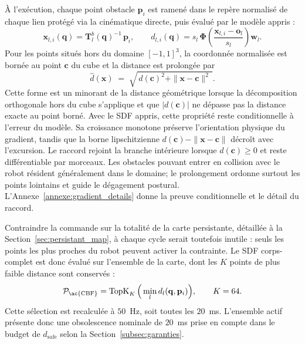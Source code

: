 À l'exécution, chaque point obstacle $\mathbf{p}_i$ est ramené dans le repère normalisé de chaque lien protégé via la cinématique directe, puis évalué par le modèle appris :
\begin{equation}
\mathbf{x}_{l,i}(\mathbf{q}) = \mathbf{T}_{l}^{b}(\mathbf{q})^{-1}\,\mathbf{p}_i,
\qquad
d_{l,i}(\mathbf{q}) = s_l\,\boldsymbol{\Phi}\!\left(\frac{\mathbf{x}_{l,i}-\mathbf{o}_l}{s_l}\right)\mathbf{w}_l.
\end{equation}
Pour les points situés hors du domaine $[-1,1]^3$, la coordonnée normalisée est bornée au point $\mathbf{c}$ du cube et la distance est prolongée par
\begin{equation}
\hat{d}(\mathbf{x}) \;=\; \sqrt{\,d(\mathbf{c})^{2} + \|\mathbf{x}-\mathbf{c}\|^{2}\,}.
\end{equation}
Cette forme est un minorant de la distance géométrique lorsque la décomposition orthogonale hors du cube s'applique et que $|d(\mathbf{c})|$ ne dépasse pas la distance exacte au point borné. Avec le \ac{SDF} appris, cette propriété reste conditionnelle à l'erreur du modèle. Sa croissance monotone préserve l'orientation physique du gradient, tandis que la borne lipschitzienne $d(\mathbf{c})-\|\mathbf{x}-\mathbf{c}\|$ décroît avec l'excursion. Le raccord rejoint la branche intérieure lorsque $d(\mathbf{c})\geq0$ et reste différentiable par morceaux. Les obstacles pouvant entrer en collision avec le robot résident généralement dans le domaine; le prolongement ordonne surtout les points lointains et guide le dégagement postural. L'Annexe~\ref{annexe:gradient_details} donne la preuve conditionnelle et le détail du raccord.

\label{subsec:selection}Contraindre la commande sur la totalité de la carte persistante, détaillée à la Section~\ref{sec:persistant_map}, à chaque cycle serait toutefois inutile : seuls les points les plus proches du robot peuvent activer la contrainte. Le \ac{SDF} corps-complet est donc évalué sur l'ensemble de la carte, dont les $K$ points de plus faible distance sont conservés :
\begin{equation}
\mathcal{P}_{\mathrm{\ac{CBF}}} = \operatorname{TopK}_{K}\Big( \min_l d_{l}(\mathbf{q},\mathbf{p}_i) \Big),
\qquad K = 64.
\end{equation}
Cette sélection est recalculée à $50$~Hz, soit toutes les $20$~ms. L'ensemble actif présente donc une obsolescence nominale de $20$~ms prise en compte dans le budget de $d_{\mathrm{safe}}$ selon la Section~\ref{subsec:garanties}.

